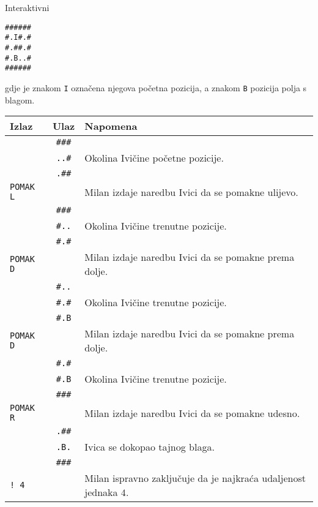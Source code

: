 \begin{statement}[
  problempoints=100,
  timelimit=1 sekunda,
  memorylimit=512 MiB,
]{Interaktivni}
\begin{centering}
\texttt{\#\#\#\#\#\#}\\
\texttt{\#.I\#.\#}\\
\texttt{\#.\#\#.\#}\\
\texttt{\#.B..\#}\\
\texttt{\#\#\#\#\#\#}\\
\end{centering}

gdje je znakom \texttt{I} označena njegova početna pozicija, a znakom \texttt{B}
pozicija polja s blagom.\\

{\renewcommand{\arraystretch}{1}
  \setlength{\tabcolsep}{6pt}
  \begin{tabular}{lcl}
    Izlaz & Ulaz & Napomena \\ \midrule
      & \texttt{\#\#\#} & \\
      & \texttt{..\#} & Okolina Ivičine početne pozicije. \\
      & \texttt{.\#\#} & \\
    \texttt{POMAK L} & & Milan izdaje naredbu Ivici da se pomakne ulijevo. \\
      & \texttt{\#\#\#} & \\
      & \texttt{\#..} & Okolina Ivičine trenutne pozicije. \\
      & \texttt{\#.\#} & \\
    \texttt{POMAK D} & & Milan izdaje naredbu Ivici da se pomakne prema dolje. \\
      & \texttt{\#..} & \\
      & \texttt{\#.\#} & Okolina Ivičine trenutne pozicije. \\
      & \texttt{\#.B} & \\
    \texttt{POMAK D} & & Milan izdaje naredbu Ivici da se pomakne prema dolje. \\
      & \texttt{\#.\#} & \\
      & \texttt{\#.B} & Okolina Ivičine trenutne pozicije. \\
      & \texttt{\#\#\#} & \\
    \texttt{POMAK R} & & Milan izdaje naredbu Ivici da se pomakne udesno. \\
      & \texttt{.\#\#} & \\
      & \texttt{.B.} & Ivica se dokopao tajnog blaga. \\
      & \texttt{\#\#\#} & \\
    \texttt{\frenchspacing! 4} & & Milan ispravno zaključuje da je najkraća udaljenost jednaka $4$. \\
\end{tabular}}

\end{statement}

